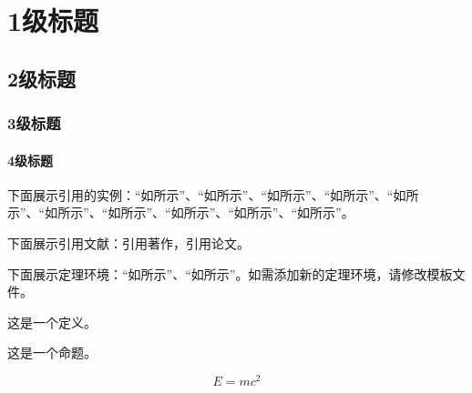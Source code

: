 \chapter{1级标题}\label{cha_one}
\section{2级标题}\label{sec_two}
\subsection{3级标题}\label{subsec_three}
\subsubsection{4级标题}\label{subsubsec_four}

下面展示引用的实例：“如所示”、“如所示”、“如所示”、“如所示”、“如所示”、“如所示”、“如所示”、“如所示”、“如所示”、“如所示”。

下面展示引用文献：引用著作，引用论文。

下面展示定理环境：“如所示”、“如所示”。如需添加新的定理环境，请修改模板文件。
\begin{defn}\label{def_1}
	这是一个定义。
\end{defn}
\begin{prop}\label{prop_2}
	这是一个命题。
\end{prop}

\begin{equation}\label{eq_emc}
	E=mc^2
\end{equation}


